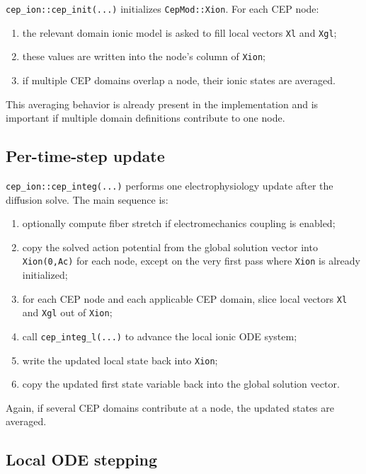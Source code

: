 \documentclass[11pt]{article}
\begin{document}
\texttt{cep\_ion::cep\_init(...)} initializes \texttt{CepMod::Xion}. For each CEP node:
\begin{enumerate}[leftmargin=*]
\item the relevant domain ionic model is asked to fill local vectors \texttt{Xl} and \texttt{Xgl};
\item these values are written into the node's column of \texttt{Xion};
\item if multiple CEP domains overlap a node, their ionic states are averaged.
\end{enumerate}

This averaging behavior is already present in the implementation and is important if multiple domain definitions contribute to one node.

\subsection{Per-time-step update}

\texttt{cep\_ion::cep\_integ(...)} performs one electrophysiology update after the diffusion solve. The main sequence is:
\begin{enumerate}[leftmargin=*]
\item optionally compute fiber stretch if electromechanics coupling is enabled;
\item copy the solved action potential from the global solution vector into \texttt{Xion(0,Ac)} for each node, except on the very first pass where \texttt{Xion} is already initialized;
\item for each CEP node and each applicable CEP domain, slice local vectors \texttt{Xl} and \texttt{Xgl} out of \texttt{Xion};
\item call \texttt{cep\_integ\_l(...)} to advance the local ionic ODE system;
\item write the updated local state back into \texttt{Xion};
\item copy the updated first state variable back into the global solution vector.
\end{enumerate}

Again, if several CEP domains contribute at a node, the updated states are averaged.

\subsection{Local ODE stepping}
\end{document}

